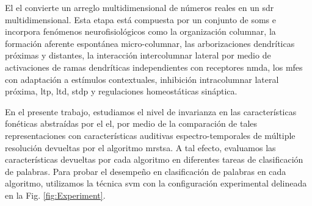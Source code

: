
El \gls{el} convierte un arreglo multidimensional de números reales en un \gls{sdr} multidimensional. Esta etapa está compuesta por un conjunto de \glspl{som} \cite{kohonen_2082, Kohonen:1989:SAM:69371} e incorpora fenómenos neurofisiológicos como la organización columnar, la formación aferente espontánea micro-columnar, las arborizaciones dendríticas próximas y distantes, la interacción intercolumnar lateral por medio de activaciones de ramas dendríticas independientes con receptores \gls{nmda}, los \glspl{mfe} con adaptación a estímulos contextuales, inhibición intracolumnar lateral próxima, \gls{ltp}, \gls{ltd}, \gls{stdp} y regulaciones homeostáticas sináptica.


En el presente trabajo, estudiamos el nivel de invarianza en las características fonéticas abstraídas por el \gls{el}, por medio de la comparación de tales representaciones con características auditivas espectro-temporales de múltiple resolución devueltas por el algoritmo \gls{mrstsa}. A tal efecto, evaluamos las características devueltas por cada algoritmo en diferentes tareas de clasificación de palabras. Para probar el desempeño en clasificación de palabras en cada algoritmo, utilizamos la técnica \gls{svm} con la configuración experimental delineada en la Fig. \ref{fig:Experiment}.

